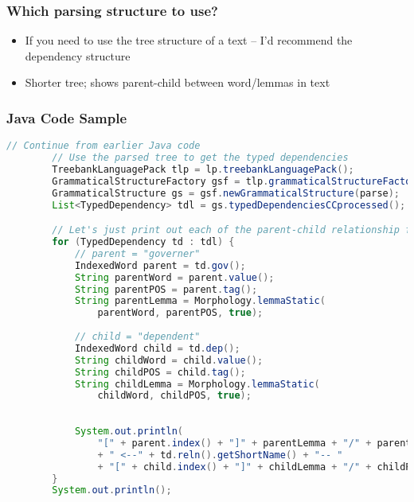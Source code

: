 \begin{frame}
\frametitle{Which parsing structure to use?}

\begin{itemize}
\item If you need to use the tree structure of a text -- I'd recommend the \alert{dependency} structure
\item Shorter tree; shows parent-child between word/lemmas in text
\end{itemize}
\end{frame} 


\begin{frame}
\frametitle{Java Code Sample}
    
\begin{lstlisting}[language=Java,basicstyle=\ttfamily\footnotesize,gobble=8,
    emph={parse,lp,typedDependenciesCCprocessed,lemmaStatic,dep,gov,reln,index,tag,value},
    morekeywords={TreebankLanguagePack,GrammaticalStructureFactory,GrammaticalStructure,
        List,TypedDependency,IndexedWord,String,Morphology},
        escapechar=|]
        // Continue from earlier Java code 
        // Use the parsed tree to get the typed dependencies
        TreebankLanguagePack tlp = lp.treebankLanguagePack();
        GrammaticalStructureFactory gsf = tlp.grammaticalStructureFactory();
        GrammaticalStructure gs = gsf.newGrammaticalStructure(parse);
        List<TypedDependency> tdl = gs.typedDependenciesCCprocessed();

        // Let's just print out each of the parent-child relationship first
        for (TypedDependency td : tdl) {
            // parent = "governer"
            IndexedWord parent = td.gov();
            String parentWord = parent.value();
            String parentPOS = parent.tag();
            String parentLemma = Morphology.lemmaStatic(
                parentWord, parentPOS, true);
            
            // child = "dependent"
            IndexedWord child = td.dep();
            String childWord = child.value();
            String childPOS = child.tag();
            String childLemma = Morphology.lemmaStatic(
                childWord, childPOS, true);
            
            
            System.out.println(
                "[" + parent.index() + "]" + parentLemma + "/" + parentPOS 
                + " <--" + td.reln().getShortName() + "-- "
                + "[" + child.index() + "]" + childLemma + "/" + childPOS);
        }
        System.out.println();
\end{lstlisting}

\end{frame}


